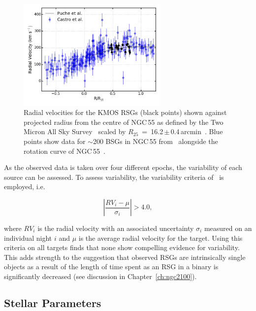 \begin{figure}
 \centering
 \includegraphics[width=0.65\textwidth]{ngc55/NGC55-RvsRV}
 \caption[Radial velocities for KMOS targets shown against projected radius]{
 Radial velocities for the KMOS RSGs (black points) shown against projected radius from the centre of NGC\,55 as defined by the Two Micron All Sky Survey~\citep[2MASS;][]{2006AJ....131.1163S} scaled by $R_{25}$~=~16.2\,$\pm$\,0.4\,arcmin~\citep{1991rc3..book.....D}.
Blue points show data for $\sim$200 BSGs in NGC\,55 from~\citet[][shown with 50\% transparency to highlight densely populated areas]{2008A&A...485...41C} alongside the rotation curve of NGC\,55~\citep[black solid line;][]{1991AJ....101..447P}.}
 \label{fig:RvsRV}
\end{figure}

As the observed data is taken over four different epochs, the variability of each source can be assessed.
To assess variability, the variability criteria of~\citet{2012A&A...546A..73H} is employed, i.e.

\begin{equation}
  \left|\frac{RV_i - \mu}{\sigma_i}\right| > 4.0,\label{eq:vary}
\end{equation}

\noindent where $RV_i$ is the radial velocity with an associated uncertainty  $\sigma_i$ measured on an individual night $i$ and $\mu$ is the average radial velocity for the target.
Using this criteria on all targets finds that none show compelling evidence for variability.
This adds strength to the suggestion that observed RSGs are intrinsically single objects as a result of the length of time spent as an RSG in a binary is significantly decreased (see discussion in Chapter~\ref{ch:ngc2100}).


\subsection{Stellar Parameters} %
\label{sub:stellar_parameters}

